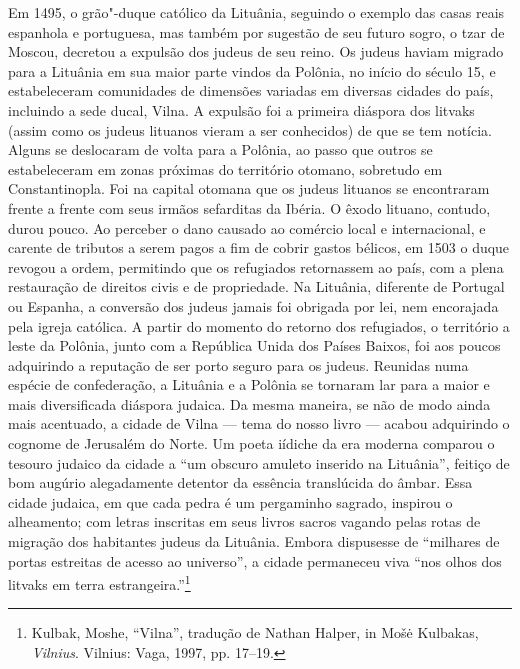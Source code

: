 Em 1495, o grão"-duque católico da Lituânia, seguindo o exemplo das casas
reais espanhola e portuguesa, mas também por sugestão de seu futuro
sogro, o tzar de Moscou, decretou a expulsão dos judeus de seu reino. Os
judeus haviam migrado para a Lituânia em sua maior parte vindos da
Polônia, no início do século 15, e estabeleceram comunidades de
dimensões variadas em diversas cidades do país, incluindo a sede ducal,
Vilna. A expulsão foi a primeira diáspora dos litvaks (assim como os
judeus lituanos vieram a ser conhecidos) de que se tem notícia. Alguns
se deslocaram de volta para a Polônia, ao passo que outros se
estabeleceram em zonas próximas do território otomano, sobretudo em
Constantinopla. Foi na capital otomana que os judeus lituanos se
encontraram frente a frente com seus irmãos sefarditas da Ibéria. O
êxodo lituano, contudo, durou pouco. Ao perceber o dano causado ao
comércio local e internacional, e carente de tributos a serem pagos a
fim de cobrir gastos bélicos, em 1503 o duque revogou a ordem,
permitindo que os refugiados retornassem ao país, com a plena
restauração de direitos civis e de propriedade. Na Lituânia, diferente
de Portugal ou Espanha, a conversão dos judeus jamais foi obrigada por
lei, nem encorajada pela igreja católica. A partir do momento do retorno
dos refugiados, o território a leste da Polônia, junto com a República
Unida dos Países Baixos, foi aos poucos adquirindo a reputação de ser
porto seguro para os judeus. Reunidas numa espécie de confederação, a
Lituânia e a Polônia se tornaram lar para a maior e mais diversificada
diáspora judaica. Da mesma maneira, se não de modo ainda mais acentuado,
a cidade de Vilna --- tema do nosso livro --- acabou adquirindo o cognome de
Jerusalém do Norte. Um poeta iídiche da era moderna comparou o tesouro
judaico da cidade a ``um obscuro amuleto inserido na Lituânia'', feitiço
de bom augúrio alegadamente detentor da essência translúcida do âmbar.
Essa cidade judaica, em que cada pedra é um pergaminho sagrado, inspirou
o alheamento; com letras inscritas em seus livros sacros vagando pelas
rotas de migração dos habitantes judeus da Lituânia. Embora dispusesse
de ``milhares de portas estreitas de acesso ao universo'', a cidade
permaneceu viva ``nos olhos dos litvaks em terra
estrangeira.''\footnote{Kulbak, Moshe, ``Vilna'', tradução de Nathan
  Halper, in Mošė Kulbakas, \emph{Vilnius}. Vilnius: Vaga, 1997, pp.
  17--19.}

